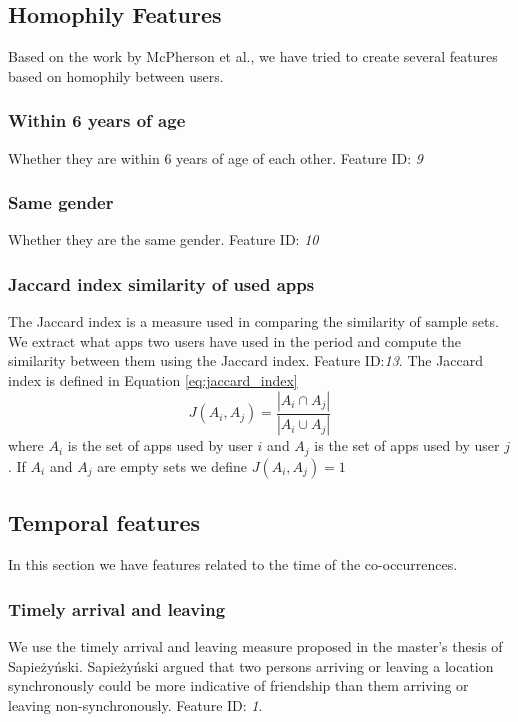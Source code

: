 \subsection{Homophily Features}
Based on the work by McPherson et al.\cite{mcpherson2001birds}, we have tried to create several features based on homophily between users.

\subsubsection{Within 6 years of age}
Whether they are within 6 years of age of each other. Feature ID: \textit{9}

\subsubsection{Same gender}
Whether they are the same gender. Feature ID: \textit{10}

\subsubsection{Jaccard index similarity of used apps}
The Jaccard index is a measure used in comparing the similarity of sample sets. We extract what apps two users have used in the period and compute the similarity between them using the Jaccard index. Feature ID:\textit{13}.
The Jaccard index is defined in Equation \ref{eq:jaccard_index}
\begin{equation}
\label{eq:jaccard_index}
J(A_i,A_j) = \frac{ |A_i \cap A_j| }{ |A_i \cup A_j | }
\end{equation}
where $A_i$ is the set of apps used by user $i$ and $A_j$ is the set of apps used by user $j$. If $A_i$ and $A_j$ are empty sets we define $J(A_i, A_j) = 1$

\subsection{Temporal features}
In this section we have features related to the time of the co-occurrences.

\subsubsection{Timely arrival and leaving}
We use the timely arrival and leaving measure proposed in the master's thesis of Sapieżyński\cite{IMM2013-06556}.
Sapieżyński argued that two persons arriving or leaving a location synchronously could be more indicative of friendship than them arriving or leaving non-synchronously.
Feature ID: \textit{1}.

